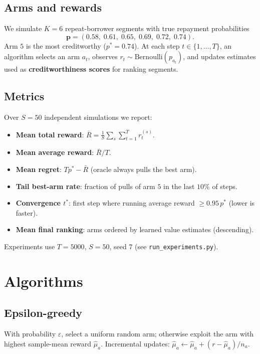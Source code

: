 \documentclass[11pt,a4paper]{article}
\begin{document}
\subsection{Arms and rewards}

We simulate $K{=}6$ repeat-borrower segments with true repayment probabilities
\[
\mathbf{p} = (0.58,\; 0.61,\; 0.65,\; 0.69,\; 0.72,\; 0.74).
\]
Arm $5$ is the most creditworthy ($p^\ast = 0.74$). At each step $t \in \{1,\ldots,T\}$, an algorithm selects an arm $a_t$, observes $r_t \sim \mathrm{Bernoulli}(p_{a_t})$, and updates estimates used as \textbf{creditworthiness scores} for ranking segments.

\subsection{Metrics}

Over $S{=}50$ independent simulations we report:
\begin{itemize}[noitemsep]
  \item \textbf{Mean total reward}: $\bar{R} = \frac{1}{S}\sum_s \sum_{t=1}^T r_t^{(s)}$.
  \item \textbf{Mean average reward}: $\bar{R}/T$.
  \item \textbf{Mean regret}: $T p^\ast - \bar{R}$ (oracle always pulls the best arm).
  \item \textbf{Tail best-arm rate}: fraction of pulls of arm $5$ in the last $10\%$ of steps.
  \item \textbf{Convergence $t^\ast$}: first step where running average reward $\geq 0.95\, p^\ast$ (lower is faster).
  \item \textbf{Mean final ranking}: arms ordered by learned value estimates (descending).
\end{itemize}

Experiments use $T{=}5000$, $S{=}50$, seed $7$ (see \texttt{run\_experiments.py}).

\section{Algorithms}

\subsection{Epsilon-greedy}

With probability $\varepsilon$, select a uniform random arm; otherwise exploit the arm with highest sample-mean reward $\hat{\mu}_a$. Incremental updates: $\hat{\mu}_a \leftarrow \hat{\mu}_a + (r - \hat{\mu}_a)/n_a$.
\end{document}
